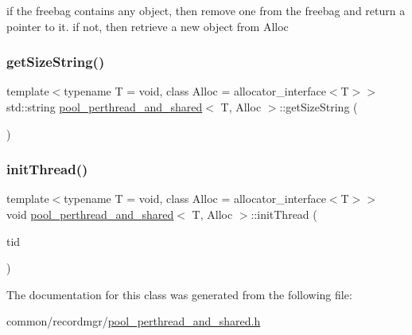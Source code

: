 if the freebag contains any object, then remove one from the freebag and return a pointer to it. if not, then retrieve a new object from Alloc \mbox{\label{classpool__perthread__and__shared_a25687267084000ddc8c08fcf5fd783d6}} 
\subsubsection{\texorpdfstring{get\+Size\+String()}{getSizeString()}}
{\footnotesize\ttfamily template$<$typename T  = void, class Alloc  = allocator\+\_\+interface$<$\+T$>$$>$ \\
std\+::string \hyperlink{classpool__perthread__and__shared}{pool\+\_\+perthread\+\_\+and\+\_\+shared}$<$ T, Alloc $>$\+::get\+Size\+String (\begin{DoxyParamCaption}{ }\end{DoxyParamCaption})\hspace{0.3cm}{\ttfamily [inline]}}

\mbox{\label{classpool__perthread__and__shared_a672fc4d4dce0b8f4f2418faf9e20b66e}} 
\subsubsection{\texorpdfstring{init\+Thread()}{initThread()}}
{\footnotesize\ttfamily template$<$typename T  = void, class Alloc  = allocator\+\_\+interface$<$\+T$>$$>$ \\
void \hyperlink{classpool__perthread__and__shared}{pool\+\_\+perthread\+\_\+and\+\_\+shared}$<$ T, Alloc $>$\+::init\+Thread (\begin{DoxyParamCaption}\item[{const int}]{tid }\end{DoxyParamCaption})\hspace{0.3cm}{\ttfamily [inline]}}



The documentation for this class was generated from the following file\+:\begin{DoxyCompactItemize}
\item 
common/recordmgr/\hyperlink{pool__perthread__and__shared_8h}{pool\+\_\+perthread\+\_\+and\+\_\+shared.\+h}\end{DoxyCompactItemize}
